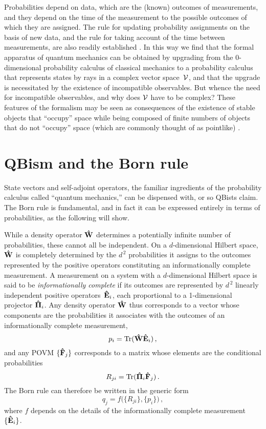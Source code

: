 \documentclass[12pt]{article}
\newcommand{\be}{\begin{equation}}
\newcommand{\ee}{\end{equation}}
\newcommand{\hE}{{\bf\hat E}}
\newcommand{\hF}{{\bf\hat F}}
\newcommand{\hW}{{\bf\hat W}}
\newcommand{\hPi}{{\bf\hat\Pi}}
\newcommand{\cV}{{\cal V}}
\begin{document}
Probabilities depend on data, which are the (known) outcomes of measurements, and they depend on the time of the measurement to the possible outcomes of which they are assigned. The rule for updating probability assignments on the basis of new data, and the rule for taking account of the time between measurements, are also readily established \cite{Mohrhoff-QMexplained}. In this way we find that the formal apparatus of quantum mechanics can be obtained by upgrading from the 0-dimensional probability calculus of classical mechanics to a probability calculus that represents states by rays in a complex vector space~$\cV$, and that the upgrade is necessitated by the existence of incompatible observables. But whence the need for incompatible observables, and why does $\cV$ have to be complex? These features of the formalism may be seen as consequences of the existence of stable objects that ``occupy'' space while being composed of finite numbers of objects that do not ``occupy'' space (which are commonly thought of as pointlike) \cite{Mohrhoff_Manifesting,Mohrhoff-QMexplained}.


\section{QBism and the Born rule}\label{sec.QBBorn}
State vectors and self-adjoint operators, the familiar ingredients of the probability calculus called ``quantum mechanics,'' can be dispensed with, or so QBists claim. The Born rule is fundamental, and in fact it can be expressed entirely in terms of probabilities, as the following will show.

While a density operator $\hW$ determines a potentially infinite number of probabilities, these cannot all be independent. On a $d$-dimensional Hilbert space, $\hW$ is completely determined by the $d^{\,2}$ probabilities it assigns to the outcomes represented by the positive operators constituting an informationally complete measurement. A measurement on a system with a $d$-dimensional Hilbert space is said to be \emph{informationally complete} if its outcomes are represented by $d^{\,2}$ linearly independent positive operators~$\hE_i$, each proportional to a 1-dimensional projector $\hPi_i$. Any density operator $\hW$ thus corresponds to a vector whose components are the probabilities it associates with the outcomes of an informationally complete measurement,
\be
p_i=\hbox{Tr}(\hW\hE_i)\,,
\ee
and any POVM $\{\hF_j\}$ corresponds to a matrix whose elements are the conditional probabilities
\be
R_{ji}=\hbox{Tr}(\hPi_i\hF_j)\,.
\ee
The Born rule can therefore be written in the generic form
\be
q_j= f \bigl(\{R_{ji}\},\{p_i\}\bigr)\,,
\label{eq.genericBorn}
\ee
where $f$ depends on the details of the informationally complete measurement $\{\hE_i\}$.
\end{document}
